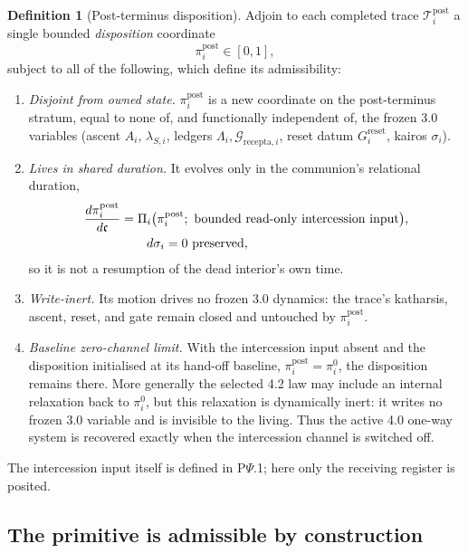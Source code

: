 \documentclass[11pt,a4paper]{article}
\newcommand{\cint}{\ensuremath{\mathfrak c}}
\theoremstyle{definition}
\newtheorem{definition}{Definition}[section]
\theoremstyle{plain}
\theoremstyle{remark}
\begin{document}
\begin{definition}[Post-terminus disposition]\label{def:postdisp}
Adjoin to each completed trace \(\mathcal T_i^{\mathrm{post}}\) a single bounded
\emph{disposition} coordinate
\[
\boxed{\;
\pi_i^{\mathrm{post}}\in[0,1],
\;}
\]
subject to all of the following, which define its admissibility:
\begin{enumerate}[label=\textup{(\alph*)},leftmargin=1.2cm]
\item \emph{Disjoint from owned state.} \(\pi_i^{\mathrm{post}}\) is a new coordinate on the
post-terminus stratum, equal to none of, and functionally independent of, the frozen 3.0
variables (ascent \(A_i\), \(\lambda_{S,i}\), ledgers \(\Lambda_i,\mathcal G_{\mathrm{recepta},i}\),
reset datum \(G_i^{\mathrm{reset}}\), kairos \(\sigma_i\)).
\item \emph{Lives in shared duration.} It evolves only in the communion's relational duration,
\[
\begin{aligned}
\frac{d\pi_i^{\mathrm{post}}}{d\cint}
&=
\Pi_i\bigl(\pi_i^{\mathrm{post}};\ \text{bounded read-only intercession input}\bigr),\\
&\hphantom{={}}\quad d\sigma_i=0\ \text{preserved},
\end{aligned}
\]
so it is not a resumption of the dead interior's own time.
\item \emph{Write-inert.} Its motion drives no frozen 3.0 dynamics: the trace's katharsis,
ascent, reset, and gate remain closed and untouched by \(\pi_i^{\mathrm{post}}\).
\item \emph{Baseline zero-channel limit.} With the intercession input absent and the
disposition initialised at its hand-off baseline, \(\pi_i^{\mathrm{post}}=\pi_i^0\), the
disposition remains there. More generally the selected 4.2 law may include an internal
relaxation back to \(\pi_i^0\), but this relaxation is dynamically inert: it writes no frozen
3.0 variable and is invisible to the living. Thus the active 4.0 one-way system is recovered
exactly when the intercession channel is switched off.
\end{enumerate}
The intercession input itself is defined in P$\Psi$.1; here only the receiving register is
posited.
\end{definition}

\subsection{The primitive is admissible by construction}
\end{document}
